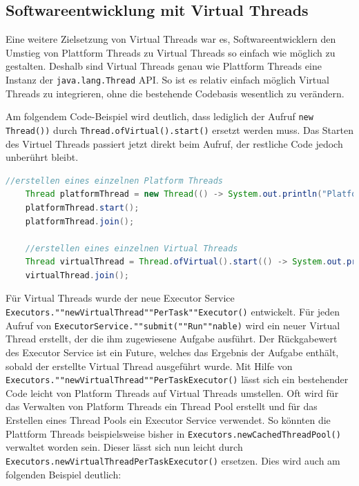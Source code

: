 \documentclass[fontsize=12pt,paper=a4,twoside=semi,parskip=half-,headsepline,headinclude]{scrreprt}
\newcommand{\code}[1]{\texttt{#1}}
\begin{document}
\subsection{Softwareentwicklung mit Virtual Threads}

Eine weitere Zielsetzung von Virtual Threads war es, Softwareentwicklern den Umstieg von Plattform Threads zu Virtual Threads so einfach wie möglich zu gestalten. Deshalb sind Virtual Threads genau wie Plattform Threads eine Instanz der \code{java.lang.Thread} API. So ist es relativ einfach möglich Virtual Threads zu integrieren, ohne die bestehende Codebasis wesentlich zu verändern.

Am folgendem Code-Beispiel wird deutlich, dass lediglich der Aufruf \code{new Thread())} durch \code{Thread.ofVirtual().start()} ersetzt werden muss. Das Starten des Virtuel Threads passiert jetzt direkt beim Aufruf, der restliche Code jedoch unberührt bleibt.

\begin{lstlisting}[language=Java]
	//erstellen eines einzelnen Platform Threads	
	Thread platformThread = new Thread(() -> System.out.println("Platform Thread"));
	platformThread.start();
	platformThread.join();

	//erstellen eines einzelnen Virtual Threads
	Thread virtualThread = Thread.ofVirtual().start(() -> System.out.println("Virtual Thread"));
	virtualThread.join();
\end{lstlisting}

Für Virtual Threads wurde der neue Executor Service \code{Executors.""newVirtualThread""PerTask""Executor()} entwickelt. Für jeden Aufruf von \texttt{ExecutorService.""submit(""Run""nable)} wird ein neuer Virtual Thread erstellt, der die ihm zugewiesene Aufgabe ausführt. Der Rückgabewert des Executor Service ist ein Future, welches das Ergebnis der Aufgabe enthält, sobald der erstellte Virtual Thread ausgeführt wurde. Mit Hilfe von \code{Executors.""newVirtualThread""PerTaskExecutor()} lässt sich ein bestehender Code leicht von Platform Threads auf Virtual Threads umstellen. Oft wird für das Verwalten von Platform Threads ein Thread Pool erstellt und für das Erstellen eines Thread Pools ein Executor Service verwendet. So könnten die Plattform Threads beispielsweise bisher in \code{Executors.newCachedThreadPool()} verwaltet worden sein. Dieser lässt sich nun leicht durch \code{Executors.newVirtualThreadPerTaskExecutor()} ersetzen. Dies wird auch am folgenden Beispiel deutlich:
\end{document}
